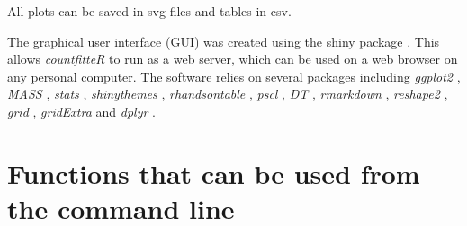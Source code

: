 All plots can be saved in svg files and tables in csv.

The graphical user interface  (GUI) was created using  the shiny package \citep{shiny}. This allows \emph{countfitteR} to run as a web server, which can be used on a web browser on any personal computer. The software relies on several packages including \emph{ggplot2} \citep{ggplot2}, \emph{MASS} \citep{MASS}, \emph{stats} \citep{Rrr}, \emph{shinythemes} \citep{shinythemes}, \emph{rhandsontable} \citep{rhandsontable}, \emph{pscl} \citep{pscl}, \emph{DT} \citep{DT}, \emph{rmarkdown} \citep{rmarkdown}, \emph{reshape2} \citep{reshape2}, \emph{grid} \citep{Rrr}, \emph{gridExtra} \citep{gridextra} and \emph{dplyr}  \citep{dplyr}.


% 

\section{Functions that can be used from the command line}

